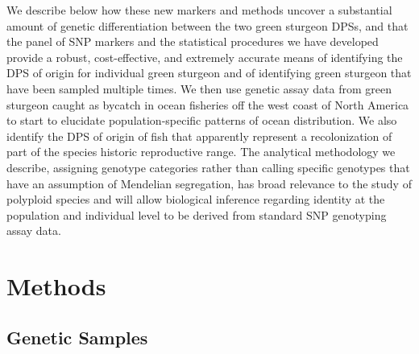 \documentclass[twocolumn,natbib]{svjour3}       %
\begin{document}
We describe below how these new markers and methods uncover a substantial amount
of genetic differentiation between the two green sturgeon DPSs, and that the
panel of SNP markers and the statistical procedures we have developed provide a
robust, cost-effective, and extremely accurate means of identifying the DPS of
origin for individual green sturgeon and of identifying green sturgeon that have
been sampled multiple times. We then use genetic assay data from green sturgeon
caught as bycatch in ocean fisheries off the west coast of North America to start
to elucidate population-specific patterns of ocean distribution. We also identify
the DPS of origin of fish that apparently represent a recolonization of part of the species
historic reproductive range. The analytical methodology we describe, assigning genotype
categories rather than calling specific genotypes that have an assumption of 
Mendelian segregation, has broad relevance to the study of polyploid species 
and will allow biological inference regarding identity at the population and 
individual level to be derived from standard SNP genotyping assay data.








\section{Methods}



\subsection{Genetic Samples}
\end{document}
